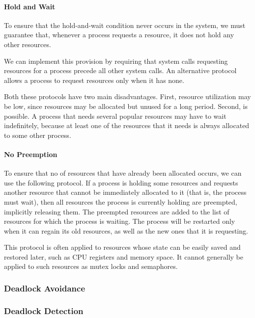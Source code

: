 \paragraph{Hold and Wait}\label{par:Deadlock_Prevention-Hold_Wait}
To ensure that the hold-and-wait condition never occurs in the system, we must guarantee that, whenever a process requests a resource, it does not hold any other resources.

We can implement this provision by requiring that system calls requesting resources for a process precede all other system calls.
An alternative protocol allows a process to request resources only when it has none.

Both these protocols have two main disadvantages.
First, resource utilization may be low, since resources may be allocated but unused for a long period.
Second,  is possible.
A process that needs several popular resources may have to wait indefinitely, because at least one of the resources that it needs is always allocated to some other process.

\paragraph{No Preemption}\label{par:Deadlock_Prevention-No_Preemption}
To ensure that no  of resources that have already been allocated occurs, we can use the following protocol.
If a process is holding some resources and requests another resource that cannot be immediately allocated to it (that is, the process must wait), then all resources the process is currently holding are preempted, implicitly releasing them.
The preempted resources are added to the list of resources for which the process is waiting.
The process will be restarted only when it can regain its old resources, as well as the new ones that it is requesting.

This protocol is often applied to resources whose state can be easily saved and restored later, such as CPU registers and memory space.
It cannot generally be applied to such resources as mutex locks and semaphores.

\subsubsection{Deadlock Avoidance}\label{subsubsec:Deadlock_Avoidance}
\subsubsection{Deadlock Detection}\label{subsubsec:Deadlock_Detection}

